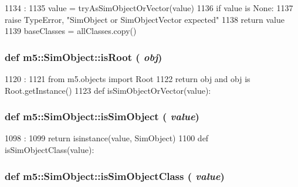 \begin{DoxyCode}
1134                                   :
1135     value = tryAsSimObjectOrVector(value)
1136     if value is None:
1137         raise TypeError, "SimObject or SimObjectVector expected"
1138     return value
1139 
baseClasses = allClasses.copy()
\end{DoxyCode}
\hypertarget{namespacem5_1_1SimObject_aef605964985cf8cf573f4f437f6c72ba}{
\subsubsection[{isRoot}]{\setlength{\rightskip}{0pt plus 5cm}def m5::SimObject::isRoot ( {\em obj})}}
\label{namespacem5_1_1SimObject_aef605964985cf8cf573f4f437f6c72ba}



\begin{DoxyCode}
1120                :
1121     from m5.objects import Root
1122     return obj and obj is Root.getInstance()
1123 
def isSimObjectOrVector(value):
\end{DoxyCode}
\hypertarget{namespacem5_1_1SimObject_a8b87728ddb828de4c37dfeb281a9bf66}{
\subsubsection[{isSimObject}]{\setlength{\rightskip}{0pt plus 5cm}def m5::SimObject::isSimObject ( {\em value})}}
\label{namespacem5_1_1SimObject_a8b87728ddb828de4c37dfeb281a9bf66}



\begin{DoxyCode}
1098                       :
1099     return isinstance(value, SimObject)
1100 
def isSimObjectClass(value):
\end{DoxyCode}
\hypertarget{namespacem5_1_1SimObject_a064e44b8ffd7d3bc78b59a94653201cb}{
\subsubsection[{isSimObjectClass}]{\setlength{\rightskip}{0pt plus 5cm}def m5::SimObject::isSimObjectClass ( {\em value})}}
\label{namespacem5_1_1SimObject_a064e44b8ffd7d3bc78b59a94653201cb}



